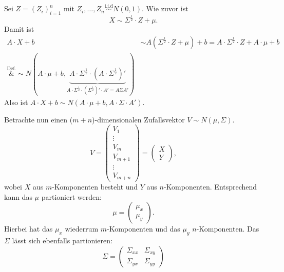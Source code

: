\documentclass[10pt]{article}
\newcommand{\halb}{\frac{1}{2}} %
\newenvironment{BWS}[1][]
{\begin{Beweis}[frametitle=#1]}{\end{Beweis}}
\begin{document}
			\begin{BWS}[Beweis 4.0.2 (Reproduktionseigenschaften der multivariaten Normalverteilung)]
				Sei $Z = (Z_i)^n_{i=1}$ mit $Z_i, \ldots, Z_n \overset{\text{i.i.d}}{\sim} {N(0,1)}$. Wie zuvor ist \begin{equation*}
					X \sim \Sigma^{\halb} \cdot Z + \mu.
				\end{equation*}
				Damit ist
				\begin{equation*}
					\begin{split}
						A \cdot X + b &\sim A(\Sigma^{\halb} \cdot Z + \mu) + b =  A \cdot \Sigma^{\halb} \cdot Z + A \cdot \mu + b\\
						\overset{\text{Def.}}&{\sim} N(A \cdot \mu +b, \underbrace{A \cdot \Sigma^{\halb} \cdot (A \cdot \Sigma^{\halb})'}_{A \cdot \Sigma^{\halb} \cdot (\Sigma^{\halb})' \cdot A' = A \Sigma A'}) 
					\end{split} 
				\end{equation*}
				Also ist $A \cdot X +b \sim N(A\cdot \mu + b, A \cdot \Sigma \cdot A')$.
			\end{BWS}
			Betrachte nun einen ($m + n$)-dimensionalen Zufallsvektor $V \sim N(\mu, \Sigma)$. 
			\begin{equation*}
				V = \left(
				\begin{array}{c}
					V_1\\
					\vdots\\
					V_m\\
					V_{m+1}\\
					\vdots\\
					V_{m+n}
				\end{array}
				\right) = \left(
				\begin{array}{c}
				X\\
				Y
				\end{array}
				\right),
			\end{equation*}
			wobei $X$ aus $m$-Komponenten besteht und $Y$ aus $n$-Komponenten. Entsprechend kann das $\mu$ partioniert werden:
			\begin{equation*}
				\mu = \left(
				\begin{array}{c}
					\mu_x\\
					\mu_y
				\end{array}
				\right).
			\end{equation*}
			Hierbei hat das $\mu_x$ wiederrum $m$-Komponenten und das $\mu_y$ $n$-Komponenten. Das $\Sigma$ lässt sich ebenfalls partionieren:
			\begin{equation*}
				\Sigma = \begin{pmatrix}
					\Sigma_{xx} & \Sigma_{xy} \\ \Sigma_{yx} & \Sigma_{yy}
				\end{pmatrix}
			\end{equation*}
\end{document}
